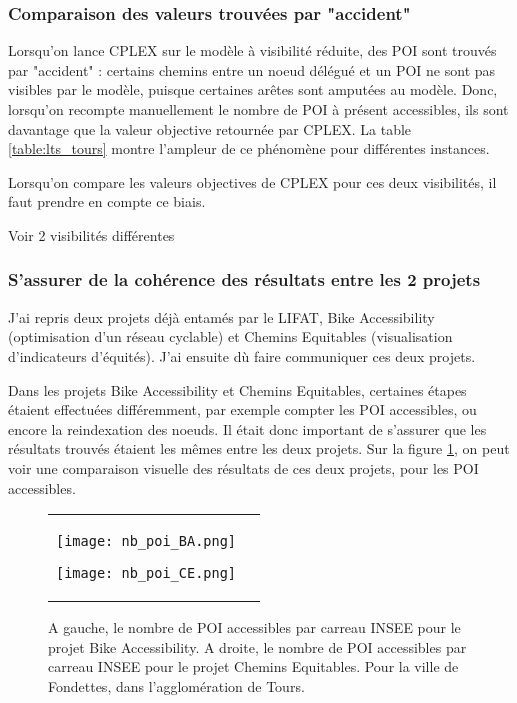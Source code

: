 \documentclass[a4paper,12pt,french]{article}
\begin{document}
\subsubsection{Comparaison des valeurs trouvées par "accident"}

Lorsqu'on lance CPLEX sur le modèle à visibilité réduite, des POI sont trouvés par "accident" : certains chemins entre un noeud délégué et un POI ne sont pas visibles par le modèle, puisque certaines arêtes sont amputées au modèle. Donc, lorsqu'on recompte manuellement le nombre de POI à présent accessibles, ils sont davantage que la valeur objective retournée par CPLEX. La table \ref{table:lts_tours} montre l'ampleur de ce phénomène pour différentes instances.

Lorsqu'on compare les valeurs objectives de CPLEX pour ces deux visibilités, il faut prendre en compte ce biais.

Voir 2 visibilités différentes

\subsubsection{S'assurer de la cohérence des résultats entre les 2 projets}

J'ai repris deux projets déjà entamés par le LIFAT, Bike Accessibility (optimisation d'un réseau cyclable) et Chemins Equitables (visualisation d'indicateurs d'équités). J'ai ensuite dù faire communiquer ces deux projets. 

Dans les projets Bike Accessibility et Chemins Equitables, certaines étapes étaient effectuées différemment, par exemple compter les POI accessibles, ou encore la reindexation des noeuds. Il était donc important de s'assurer que les résultats trouvés étaient les mêmes entre les deux projets. Sur la figure \ref{fig:nb_poi_compa}, on peut voir une comparaison visuelle des résultats de ces deux projets, pour les POI accessibles.

\begin{figure}[ht]
\centering
    \begin{tabular}{cc}    
        \begin{minipage}[t]{2.5in}
        \centering
        \texttt{[image: nb\_poi\_BA.png]}
        \end{minipage}
        \begin{minipage}[t]{2.5in}
        \centering
        \texttt{[image: nb\_poi\_CE.png]}
        \end{minipage}
    \end{tabular}
    \caption{A gauche, le nombre de POI accessibles par carreau INSEE pour le projet Bike Accessibility. A droite, le nombre de POI accessibles par carreau INSEE pour le projet Chemins Equitables. Pour la ville de Fondettes, dans l'agglomération de Tours.}
    \label{fig:nb_poi_compa}
\end{figure}
\end{document}
